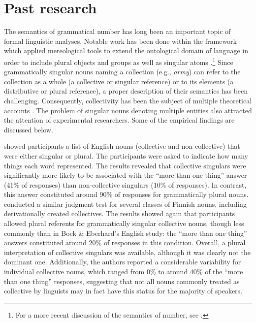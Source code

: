 \documentclass[output=paper]{langscibook}
\begin{document}
\section{Past research}
The semantics of grammatical number has long been an important topic of formal linguistic analyses. Notable work has been done within the framework which applied mereological tools to extend the ontological domain of language in order to include plural objects and groups as well as singular atoms \citep{linkGeneralizedQuantifiersPlurals1987, landmanGroups1989}.\footnote{For a more recent discussion of the semantics of number, see \citet{moltmannPluralReferenceReference2016}.} Since grammatically singular nouns naming a collection (e.g., \textit{army}) can refer to the collection as a whole (a collective or singular reference) or to its elements (a distributive or plural reference), a proper description of their semantics has been challenging. Consequently, collectivity has been the subject of multiple theoretical accounts \citep[for an overview, see][Section 1.2]{levinAgreementCollectiveNouns2001}. The problem of singular nouns denoting multiple entities also attracted the attention of experimental researchers. Some of the empirical findings are discussed below.

\citet{bockMeaningSoundSyntax1993} showed participants a list of English nouns (collective and non-collective) that were either singular or plural. The participants were asked to indicate how many things each word represented. The results revealed that collective singulars were significantly more likely to be associated with the “more than one thing” answer (41\% of responses) than non-collective singulars (10\% of responses). In contrast, this answer constituted around 90\% of responses for grammatically plural nouns. \citet{nenonenMismatchesGrammaticalNumber2010} conducted a similar judgment test for several classes of Finnish nouns, including derivationally created collectives. The results showed again that participants allowed plural referents for grammatically singular collective nouns, though less commonly than in Bock \& Eberhard’s English study: the “more than one thing” answers constituted around 20\% of responses in this condition. Overall, a plural interpretation of collective singulars was available, although it was clearly not the dominant one. Additionally, the authors reported a considerable variability for individual collective nouns, which ranged from 0\% to around 40\% of the “more than one thing” responses, suggesting that not all nouns commonly treated as collective by linguists may in fact have this status for the majority of speakers.
\end{document}
